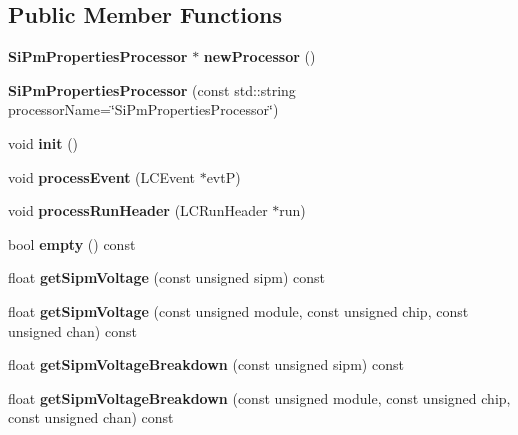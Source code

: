 \subsection*{Public Member Functions}
\begin{DoxyCompactItemize}
\item 
{\bf Si\-Pm\-Properties\-Processor} $\ast$ {\bfseries new\-Processor} ()\label{classCALICE_1_1SiPmPropertiesProcessor_afd454eeb6fff1290816bf47ea42f898c}

\item 
{\bfseries Si\-Pm\-Properties\-Processor} (const std\-::string processor\-Name=\char`\"{}Si\-Pm\-Properties\-Processor\char`\"{})\label{classCALICE_1_1SiPmPropertiesProcessor_a044da56a6b19162530ec61e971cfb3aa}

\item 
void {\bfseries init} ()\label{classCALICE_1_1SiPmPropertiesProcessor_a18867a127570598ad26694719ab3c771}

\item 
void {\bfseries process\-Event} (L\-C\-Event $\ast$evt\-P)\label{classCALICE_1_1SiPmPropertiesProcessor_aee931cd7fc7aae6d8cac48383ccf7ddb}

\item 
void {\bfseries process\-Run\-Header} (L\-C\-Run\-Header $\ast$run)\label{classCALICE_1_1SiPmPropertiesProcessor_aecd18f72518fdf995c5b4f4999f9cc0f}

\item 
bool {\bfseries empty} () const \label{classCALICE_1_1SiPmPropertiesProcessor_a96c5115d41b6e12ac39c9cd0a26f09f7}

\item 
float {\bfseries get\-Sipm\-Voltage} (const unsigned sipm) const \label{classCALICE_1_1SiPmPropertiesProcessor_a2307382303dd5bb2c08d3295990a4f60}

\item 
float {\bfseries get\-Sipm\-Voltage} (const unsigned module, const unsigned chip, const unsigned chan) const \label{classCALICE_1_1SiPmPropertiesProcessor_a1de2cff608caca6853e6dd49548cc850}

\item 
float {\bfseries get\-Sipm\-Voltage\-Breakdown} (const unsigned sipm) const \label{classCALICE_1_1SiPmPropertiesProcessor_a8a39af189b46542e8d1856c57c5d188c}

\item 
float {\bfseries get\-Sipm\-Voltage\-Breakdown} (const unsigned module, const unsigned chip, const unsigned chan) const \label{classCALICE_1_1SiPmPropertiesProcessor_a14383cb4e8ea51d094b7fa26da0ff285}


\end{DoxyCompactItemize}
